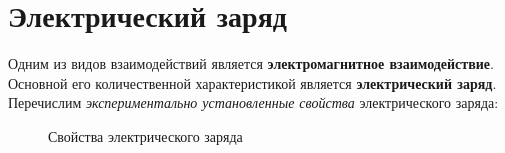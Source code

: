 \section{Электрический заряд}
    Одним из видов взаимодействий является \textbf{электромагнитное
    взаимодействие}. Основной его количественной характеристикой является
    \textbf{электрический заряд}. Перечислим \textit{экспериментально
    установленные свойства} электрического заряда:
    \begin{figure}[h]
        \center
        \hfill
        \hfill
        \caption{Свойства электрического заряда}
    \end{figure}
